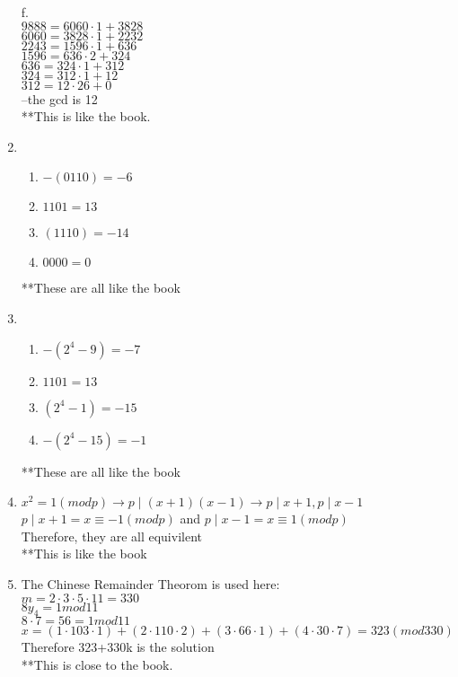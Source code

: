 \documentclass{article}
\begin{document}
\begin{enumerate}
	f. \\
		$9888 = 6060 \cdot 1 +3828$ \\
		$6060 = 3828 \cdot 1 +2232$ \\
		$2243 = 1596 \cdot 1 +636$ \\
		$1596 = 636 \cdot 2 +324$ \\
		$636 = 324 \cdot 1 +312$ \\
		$324 = 312 \cdot 1 +12$ \\
		$312 = 12 \cdot 26 +0$ \\
		--the gcd is 12 \\
		**This is like the book.

\item 
	\begin{enumerate}
	\item $-(0110) = -6$
	\item $1101 = 13$
	\item $(1110) = -14$
	\item $0000 = 0$
	\end{enumerate}		
	**These are all like the book	
	
\item
	\begin{enumerate}
	\item $-(2^4 - 9) = -7$
	\item $1101 = 13$
	\item $(2^4 -1) = -15$
	\item $-(2^4 - 15) = -1$
	\end{enumerate}		
	**These are all like the book

\item	$x^2 = 1(modp) \rightarrow p \mid(x+1)(x-1) \rightarrow p\mid x+1, p\mid x-1$ \\
	$p\mid x+1 = x \equiv -1(mod p)$ and $p\mid x-1 = x \equiv 1(modp)$\\
	Therefore, they are all equivilent \\
	**This is like the book

\item The Chinese Remainder Theorom is used here: \\
	$m = 2 \cdot 3 \cdot 5 \cdot 11 = 330$ \\
	$8 y_4 = 1 mod11$\\
	$8 \cdot 7 = 56 = 1 mod 11$\\
	$x = (1\cdot103\cdot1)+(2\cdot110\cdot2)+(3\cdot66\cdot1)+(4\cdot30\cdot7)= 323(mod330)$ \\
	Therefore 323+330k is the solution \\
	**This is close to the book. 
   

\end{enumerate}
\end{document}

